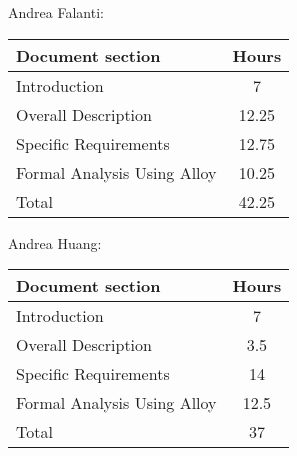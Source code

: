 Andrea Falanti:

\begin{tabular}{|l|c|}
    \hline
    Document section & Hours \\
    \hline
     Introduction & 7\\
     Overall Description & 12.25\\
     Specific Requirements & 12.75\\
     Formal Analysis Using Alloy & 10.25\\
     \hline
     Total & 42.25\\
     \hline
\end{tabular}
\vskip 0.3in

Andrea Huang:

\begin{tabular}{|l|c|}
    \hline
    Document section & Hours \\
    \hline
     Introduction &  7\\
     Overall Description & 3.5\\
     Specific Requirements & 14\\
     Formal Analysis Using Alloy & 12.5\\
     \hline
     Total & 37\\
     \hline
\end{tabular}
